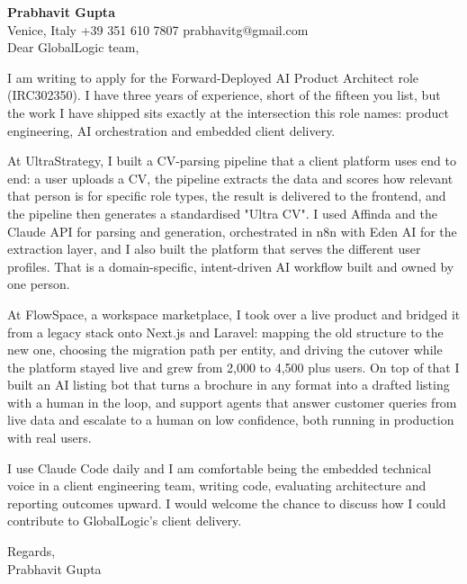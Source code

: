 \documentclass[a4paper,10.5pt]{article}
\begin{document}
\textbf{Prabhavit Gupta}\\
Venice, Italy \textbar{} +39 351 610 7807 \textbar{} prabhavitg@gmail.com\\[10pt]
Dear GlobalLogic team,

I am writing to apply for the Forward-Deployed AI Product Architect role (IRC302350). I have three years of experience, short of the fifteen you list, but the work I have shipped sits exactly at the intersection this role names: product engineering, AI orchestration and embedded client delivery.

At UltraStrategy, I built a CV-parsing pipeline that a client platform uses end to end: a user uploads a CV, the pipeline extracts the data and scores how relevant that person is for specific role types, the result is delivered to the frontend, and the pipeline then generates a standardised "Ultra CV". I used Affinda and the Claude API for parsing and generation, orchestrated in n8n with Eden AI for the extraction layer, and I also built the platform that serves the different user profiles. That is a domain-specific, intent-driven AI workflow built and owned by one person.

At FlowSpace, a workspace marketplace, I took over a live product and bridged it from a legacy stack onto Next.js and Laravel: mapping the old structure to the new one, choosing the migration path per entity, and driving the cutover while the platform stayed live and grew from 2,000 to 4,500 plus users. On top of that I built an AI listing bot that turns a brochure in any format into a drafted listing with a human in the loop, and support agents that answer customer queries from live data and escalate to a human on low confidence, both running in production with real users.

I use Claude Code daily and I am comfortable being the embedded technical voice in a client engineering team, writing code, evaluating architecture and reporting outcomes upward. I would welcome the chance to discuss how I could contribute to GlobalLogic's client delivery.

Regards,\\
Prabhavit Gupta
\end{document}
